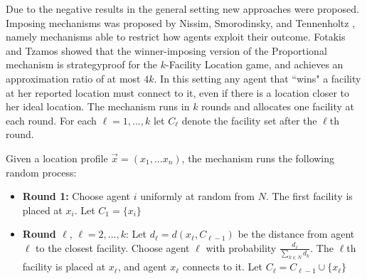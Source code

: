 Due to the negative results in the general setting new approaches were proposed. Imposing mechanisms was proposed by Nissim, Smorodinsky, and Tennenholtz \cite{Nissim2010}, namely mechanisms able to restrict how agents exploit their outcome. Fotakis and Tzamos \cite{Fotakis2013} showed that the winner-imposing version of the Proportional mechanism is strategyproof for the $k$-Facility Location game, and achieves an approximation ratio of at most $4k$. In this setting any agent that ``wins" a facility at her reported location must connect to it, even if there is a location closer to her ideal location. The mechanism runs in $k$ rounds and allocates one facility at each round. For each $\ell=1,...,k$ let $C_\ell$ denote the facility set after the $\ell$th round. 


\begin{definition}

Given a location profile $\vec{x}=(x_1,...x_n)$, the mechanism runs the following random process:
\begin{itemize}
    \item\textbf{Round 1:} Choose agent $i$ uniformly at random from $N$. The first facility is placed at $x_i$. Let $C_1=\{x_i\}$

    \item\textbf{Round $\ell$}, $\ell = 2,...,k$: Let $d_\ell = d(x_\ell,C_{\ell-1})$ be the distance from agent $\ell$ to the closest facility. Choose agent $\ell$ with probability $\frac{d_\ell}{\sum_{k\in N}d_k}$. The $\ell$th facility is placed at $x_\ell$, and agent $x_\ell$ connects to it. Let $C_\ell=C_{\ell-1}\cup \{x_\ell\}$

\end{itemize}
\end{definition}




